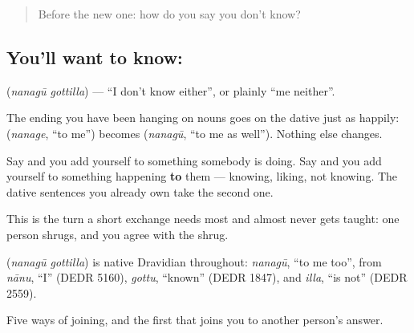 \label{lesson:KA-C68-me-neither}



\begin{quote}
Before the new one: how do you say you don't know?
\end{quote}

\subsection*{You'll want to know:  }
\textbf{ } (\emph{nanagū gottilla}) — \textquotedblleft{}I don't know either\textquotedblright{}, or plainly \textquotedblleft{}me neither\textquotedblright{}.

The ending you have been hanging on nouns goes on the dative just as happily:  (\emph{nanage}, \textquotedblleft{}to me\textquotedblright{}) becomes  (\emph{nanagū}, \textquotedblleft{}to me as well\textquotedblright{}). Nothing else changes.

Say  and you add yourself to something somebody is doing. Say  and you add yourself to something happening \textbf{to} them — knowing, liking, not knowing. The dative sentences you already own take the second one.

This is the turn a short exchange needs most and almost never gets taught: one person shrugs, and you agree with the shrug.

\begin{cousinweb}
\textbf{ } (\emph{nanagū gottilla}) is native Dravidian throughout: \emph{nanagū}, \textquotedblleft{}to me too\textquotedblright{}, from \emph{nānu}, \textquotedblleft{}I\textquotedblright{} (DEDR 5160), \emph{gottu}, \textquotedblleft{}known\textquotedblright{} (DEDR 1847), and \emph{illa}, \textquotedblleft{}is not\textquotedblright{} (DEDR 2559).
\end{cousinweb}

\begin{grammarlens}[title={What you've built}]
Five ways of joining, and the first that joins you to another person's answer.
\end{grammarlens}

